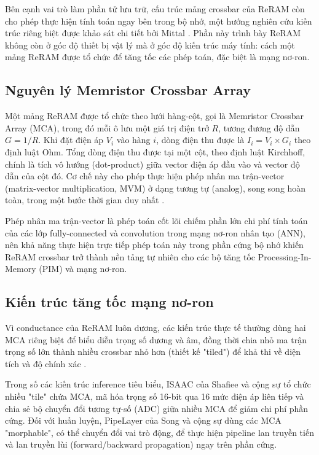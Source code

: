 \documentclass[12pt,a4paper]{article}
\begin{document}
Bên cạnh vai trò làm phần tử lưu trữ, cấu trúc mảng crossbar của ReRAM còn cho phép thực hiện tính toán ngay bên trong bộ nhớ, một hướng nghiên cứu kiến trúc riêng biệt được khảo sát chi tiết bởi Mittal \cite{mittal2019}. Phần này trình bày ReRAM không còn ở góc độ thiết bị vật lý mà ở góc độ kiến trúc máy tính: cách một mảng ReRAM được tổ chức để tăng tốc các phép toán, đặc biệt là mạng nơ-ron.

\subsection{Nguyên lý Memristor Crossbar Array}

Một mảng ReRAM được tổ chức theo lưới hàng-cột, gọi là Memristor Crossbar Array (MCA), trong đó mỗi ô lưu một giá trị điện trở $R$, tương đương độ dẫn $G = 1/R$. Khi đặt điện áp $V_i$ vào hàng $i$, dòng điện thu được là $I_i = V_i \times G_i$ theo định luật Ohm. Tổng dòng điện thu được tại một cột, theo định luật Kirchhoff, chính là tích vô hướng (dot-product) giữa vector điện áp đầu vào và vector độ dẫn của cột đó. Cơ chế này cho phép thực hiện phép nhân ma trận-vector (matrix-vector multiplication, MVM) ở dạng tương tự (analog), song song hoàn toàn, trong một bước thời gian duy nhất \cite{mittal2019}.

Phép nhân ma trận-vector là phép toán cốt lõi chiếm phần lớn chi phí tính toán của các lớp fully-connected và convolution trong mạng nơ-ron nhân tạo (ANN), nên khả năng thực hiện trực tiếp phép toán này trong phần cứng bộ nhớ khiến ReRAM crossbar trở thành nền tảng tự nhiên cho các bộ tăng tốc Processing-In-Memory (PIM) và mạng nơ-ron.

\subsection{Kiến trúc tăng tốc mạng nơ-ron}

Vì conductance của ReRAM luôn dương, các kiến trúc thực tế thường dùng hai MCA riêng biệt để biểu diễn trọng số dương và âm, đồng thời chia nhỏ ma trận trọng số lớn thành nhiều crossbar nhỏ hơn (thiết kế "tiled") để khả thi về diện tích và độ chính xác \cite{mittal2019}.

Trong số các kiến trúc inference tiêu biểu, ISAAC của Shafiee và cộng sự tổ chức nhiều "tile" chứa MCA, mã hóa trọng số 16-bit qua 16 mức điện áp liên tiếp và chia sẻ bộ chuyển đổi tương tự-số (ADC) giữa nhiều MCA để giảm chi phí phần cứng. Đối với huấn luyện, PipeLayer của Song và cộng sự dùng các MCA "morphable", có thể chuyển đổi vai trò động, để thực hiện pipeline lan truyền tiến và lan truyền lùi (forward/backward propagation) ngay trên phần cứng.
\end{document}
